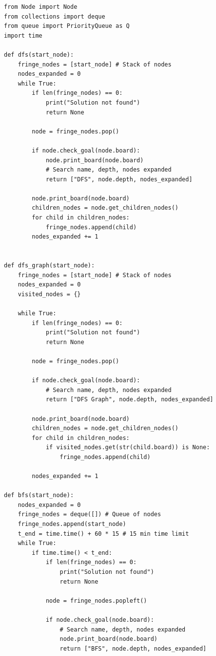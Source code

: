 \documentclass[10pt]{article}
\begin{document}
  \begin{lstlisting}
from Node import Node
from collections import deque
from queue import PriorityQueue as Q
import time

def dfs(start_node):
    fringe_nodes = [start_node] # Stack of nodes
    nodes_expanded = 0
    while True:
        if len(fringe_nodes) == 0:
            print("Solution not found")
            return None
        
        node = fringe_nodes.pop()
        
        if node.check_goal(node.board):
            node.print_board(node.board)
            # Search name, depth, nodes expanded
            return ["DFS", node.depth, nodes_expanded]

        node.print_board(node.board)
        children_nodes = node.get_children_nodes()
        for child in children_nodes:
            fringe_nodes.append(child)
        nodes_expanded += 1


def dfs_graph(start_node):
    fringe_nodes = [start_node] # Stack of nodes
    nodes_expanded = 0
    visited_nodes = {}

    while True:
        if len(fringe_nodes) == 0:
            print("Solution not found")
            return None
        
        node = fringe_nodes.pop()

        if node.check_goal(node.board):
            # Search name, depth, nodes expanded
            return ["DFS Graph", node.depth, nodes_expanded]

        node.print_board(node.board)
        children_nodes = node.get_children_nodes()
        for child in children_nodes:
            if visited_nodes.get(str(child.board)) is None:
                fringe_nodes.append(child)

        nodes_expanded += 1

def bfs(start_node):
    nodes_expanded = 0
    fringe_nodes = deque([]) # Queue of nodes
    fringe_nodes.append(start_node)
    t_end = time.time() + 60 * 15 # 15 min time limit
    while True:
        if time.time() < t_end:
            if len(fringe_nodes) == 0:
                print("Solution not found")
                return None
            
            node = fringe_nodes.popleft()

            if node.check_goal(node.board):
                # Search name, depth, nodes expanded
                node.print_board(node.board)
                return ["BFS", node.depth, nodes_expanded]
            

\end{lstlisting}
\end{document}
